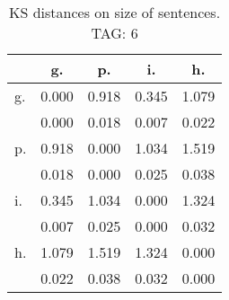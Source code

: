 \begin{table}[h!]
\begin{center}
\begin{tabular}{| l | c | c | c | c |}\hline
 & g. & p. & i. & h. \\\hline
g. & 0.000  & 0.918  & 0.345  & 1.079 \\\hline
 & 0.000  & 0.018  & 0.007  & 0.022 \\\hline
p. & 0.918  & 0.000  & 1.034  & 1.519 \\\hline
 & 0.018  & 0.000  & 0.025  & 0.038 \\\hline
i. & 0.345  & 1.034  & 0.000  & 1.324 \\\hline
 & 0.007  & 0.025  & 0.000  & 0.032 \\\hline
h. & 1.079  & 1.519  & 1.324  & 0.000 \\\hline
 & 0.022  & 0.038  & 0.032  & 0.000 \\\hline
\end{tabular}
\caption{KS distances on size of sentences. TAG: 6}
\end{center}
\end{table}